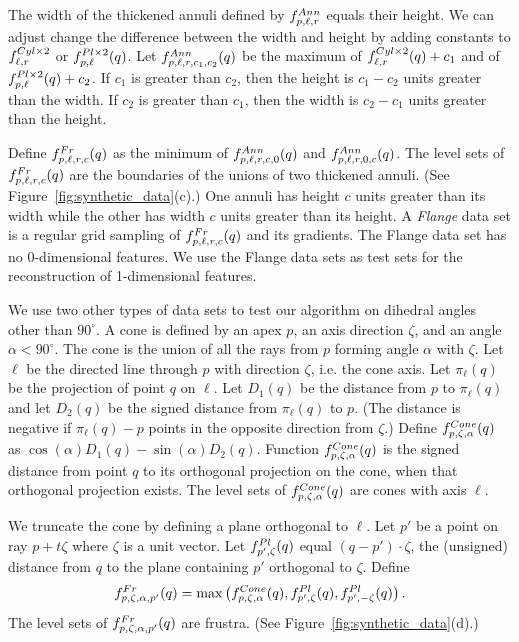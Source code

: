 The width of the thickened annuli defined by $f^{Ann}_{p,\ell,r}$
equals their height.
We can adjust change the difference between the width and height
by adding constants to $f^{Cyl \times 2}_{\ell,r}$ or $f^{Pl \times 2}_{p,\ell}(q)$.
Let $f^{Ann}_{p,\ell,r,c_1,c_2}(q)$ be the maximum 
of $f^{Cyl \times 2}_{\ell,r}(q)+c_1$ and of $f^{Pl \times 2}_{p,\ell}(q)+c_2$.
If $c_1$ is greater than $c_2$, 
then the height is $c_1-c_2$ units greater than the width.
If $c_2$ is greater than $c_1$, 
then the width is $c_2-c_1$ units greater than the height.

Define $f^{Fr}_{p,\ell,r,c}(q)$ as the minimum
of $f^{Ann}_{p,\ell,r,c,0}(q)$ and $f^{Ann}_{p,\ell,r,0,c}(q)$.
The level sets of $f^{Fr}_{p,\ell,r,c}(q)$ are the boundaries
of the unions of two thickened annuli.
(See Figure~\ref{fig:synthetic_data}(c).)
One annuli has height $c$ units greater than its width
while the other has width $c$ units greater than its height.
A {\em Flange} data set is a regular grid sampling of $f^{Fr}_{p,\ell,r,c}(q)$
and its gradients.
The Flange data set has no 0-dimensional features.
We use the Flange data sets as test sets
for the reconstruction of 1-dimensional features.

We use two other types of data sets to test our algorithm on dihedral
angles other than $90^\circ$.
A cone is defined by an apex $p$, an axis direction $\zeta$,
and an angle $\alpha < 90^\circ$.
The cone is the union of all the rays from $p$ forming angle $\alpha$
with $\zeta$.
Let $\ell$ be the directed line through $p$ with direction $\zeta$,
i.e. the cone axis.
Let $\pi_{\ell}(q)$ be the projection of point $q$ on $\ell$.
Let $D_1(q)$ be the distance from $p$ to $\pi_{\ell}(q)$
and let $D_2(q)$ be the signed distance from $\pi_{\ell}(q)$ to $p$.
(The distance is negative if $\pi_\ell(q)-p$ points in the opposite
direction from $\zeta$.)
Define $f^{Cone}_{p,\zeta,\alpha}(q)$ 
as $\cos(\alpha) D_1(q) - \sin(\alpha) D_2(q)$.
Function $f^{Cone}_{p,\zeta,\alpha}(q)$ is the signed distance
from point $q$ to its orthogonal projection on the cone,
when that orthogonal projection exists.
The level sets of $f^{Cone}_{p,\zeta,\alpha}(q)$ are cones
with axis $\ell$.

We truncate the cone by defining a plane orthogonal to $\ell$.
Let $p'$ be a point on ray $p+t\zeta$
where $\zeta$ is a unit vector.
Let $f^{Pl}_{p',\zeta}(q)$ equal $(q-p') \cdot \zeta$,
the (unsigned) distance from $q$ 
to the plane containing $p'$ orthogonal to $\zeta$.
Define
\begin{equation*}
f^{Fr}_{p,\zeta,\alpha,p'}(q) = 
\max \left ( f^{Cone}_{p,\zeta,\alpha}(q), f^{Pl}_{p',\zeta}(q), f^{Pl}_{p',-\zeta}(q)
\right ) .
\end{equation*}
The level sets of $f^{Fr}_{p,\zeta,\alpha,p'}(q)$ are frustra.
(See Figure~\ref{fig:synthetic_data}(d).)

